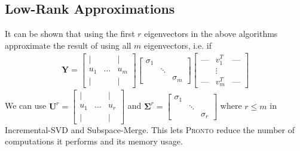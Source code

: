 \subsection{Low-Rank Approximations}
It can be shown that using the first $r$ eigenvectors in the above algorithms
approximate the result of using all $m$ eigenvectors, i.e. if
\begin{align}
\mathbf{Y} = \begin{bmatrix} \mid & & \mid \\ u_1 & \ldots & u_m
    \\ \mid & & \mid  \end{bmatrix} \begin{bmatrix} \sigma_1 &
        & \\ & \ddots & \\ & & \sigma_m \end{bmatrix} \begin{bmatrix} \text{---}
& v_1^T & \text{---} \\ & \vdots & \\ \text{---} & v_m^T & \text{---}
\end{bmatrix}
\end{align}
We can use $\mathbf{U}^r = \begin{bmatrix} \mid & & \mid \\ u_1 & \ldots & u_r
    \\ \mid & & \mid  \end{bmatrix}$ and $\mathbf{\Sigma}^r = \begin{bmatrix}
\sigma_1 & & \\ & \ddots & \\ & & \sigma_r \end{bmatrix}$ where $r \leq m$ in
Incremental-SVD and Subspace-Merge. This lets \textsc{Pronto} reduce the number of
computations it performs and its memory usage.

